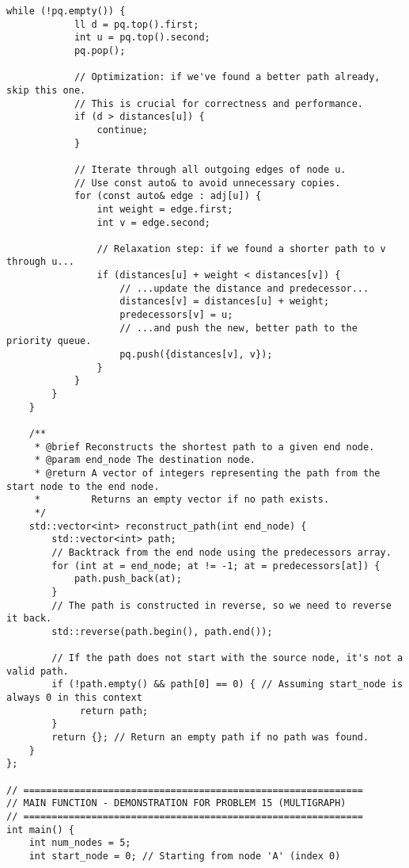 \documentclass[a4paper,12pt]{article}
\begin{document}
\begin{lstlisting}[style=cppstyle, caption={Xây dựng đa đồ thị trong C++. Logic thuật toán không đổi.}, label={lst:cpp_multi_full}]
        while (!pq.empty()) {
            ll d = pq.top().first;
            int u = pq.top().second;
            pq.pop();

            // Optimization: if we've found a better path already, skip this one.
            // This is crucial for correctness and performance.
            if (d > distances[u]) {
                continue;
            }

            // Iterate through all outgoing edges of node u.
            // Use const auto& to avoid unnecessary copies.
            for (const auto& edge : adj[u]) {
                int weight = edge.first;
                int v = edge.second;

                // Relaxation step: if we found a shorter path to v through u...
                if (distances[u] + weight < distances[v]) {
                    // ...update the distance and predecessor...
                    distances[v] = distances[u] + weight;
                    predecessors[v] = u;
                    // ...and push the new, better path to the priority queue.
                    pq.push({distances[v], v});
                }
            }
        }
    }

    /**
     * @brief Reconstructs the shortest path to a given end node.
     * @param end_node The destination node.
     * @return A vector of integers representing the path from the start node to the end node.
     *         Returns an empty vector if no path exists.
     */
    std::vector<int> reconstruct_path(int end_node) {
        std::vector<int> path;
        // Backtrack from the end node using the predecessors array.
        for (int at = end_node; at != -1; at = predecessors[at]) {
            path.push_back(at);
        }
        // The path is constructed in reverse, so we need to reverse it back.
        std::reverse(path.begin(), path.end());
        
        // If the path does not start with the source node, it's not a valid path.
        if (!path.empty() && path[0] == 0) { // Assuming start_node is always 0 in this context
             return path;
        }
        return {}; // Return an empty path if no path was found.
    }
};

// ============================================================
// MAIN FUNCTION - DEMONSTRATION FOR PROBLEM 15 (MULTIGRAPH)
// ============================================================
int main() {
    int num_nodes = 5;
    int start_node = 0; // Starting from node 'A' (index 0)


\end{lstlisting}
\end{document}
